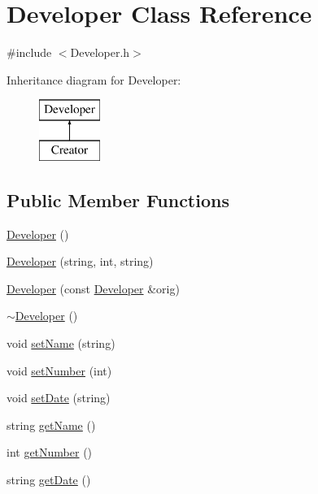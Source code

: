 \hypertarget{class_developer}{}\section{Developer Class Reference}
\label{class_developer}


{\ttfamily \#include $<$Developer.\+h$>$}

Inheritance diagram for Developer\+:\begin{figure}[H]
\begin{center}
\leavevmode
\includegraphics[height=2.000000cm]{class_developer}
\end{center}
\end{figure}
\subsection*{Public Member Functions}
\begin{DoxyCompactItemize}
\item 
\hyperlink{class_developer_a1acf937b03598b68b93c010bfc90f702}{Developer} ()
\item 
\hyperlink{class_developer_a24c1cde234cb63807179251c8516f69e}{Developer} (string, int, string)
\item 
\hyperlink{class_developer_a70d27630049849deaf3fbc8fab301908}{Developer} (const \hyperlink{class_developer}{Developer} \&orig)
\item 
\hyperlink{class_developer_a3a358890cdc55c7c473bbe0865ca0dde}{$\sim$\+Developer} ()
\item 
void \hyperlink{class_developer_aed0b441a49c60fcfbcdeb730bc6efb79}{set\+Name} (string)
\item 
void \hyperlink{class_developer_afa96e363d27b88c0c54ebffadef4f728}{set\+Number} (int)
\item 
void \hyperlink{class_developer_aebac796aa948255e4ca15c8fbbc0d010}{set\+Date} (string)
\item 
string \hyperlink{class_developer_abcaa88f55cd1dbd58daf281f8b504172}{get\+Name} ()
\item 
int \hyperlink{class_developer_ab1e964805d449751217f40e210596fc3}{get\+Number} ()
\item 
string \hyperlink{class_developer_a5ab8342af9b6352324787b66a1035c69}{get\+Date} ()
\end{DoxyCompactItemize}
